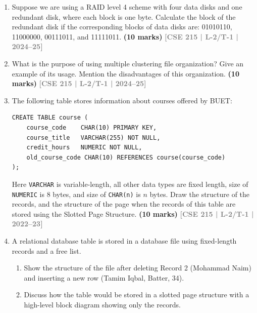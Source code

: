\documentclass[12pt]{article}
\newcommand{\yr}[1]{\hfill\textcolor{gray}{\small\textbf{[#1]}}}
\newcommand{\mk}[1]{\textcolor{orange!70!black}{\small\textbf{(#1 marks)}}}
\begin{document}
\begin{enumerate}


\item Suppose we are using a RAID level 4 scheme with four data disks and one redundant disk, where each block is one byte. Calculate the block of the redundant disk if the corresponding blocks of data disks are: 01010110, 11000000, 00111011, and 11111011.
\mk{10} \yr{CSE 215 | L-2/T-1 | 2024--25}


\item What is the purpose of using multiple clustering file organization? Give an example of its usage. Mention the disadvantages of this organization.
\mk{10} \yr{CSE 215 | L-2/T-1 | 2024--25}


\item The following table stores information about courses offered by BUET:
\begin{lstlisting}
CREATE TABLE course (
    course_code    CHAR(10) PRIMARY KEY,
    course_title   VARCHAR(255) NOT NULL,
    credit_hours   NUMERIC NOT NULL,
    old_course_code CHAR(10) REFERENCES course(course_code)
);
\end{lstlisting}
Here \texttt{VARCHAR} is variable-length, all other data types are fixed length, size of \texttt{NUMERIC} is 8 bytes, and size of \texttt{CHAR(n)} is $n$ bytes. Draw the structure of the records, and the structure of the page when the records of this table are stored using the Slotted Page Structure.
\mk{10} \yr{CSE 215 | L-2/T-1 | 2022--23}


\item A relational database table is stored in a database file using fixed-length records and a free list.
\begin{enumerate}
  \item Show the structure of the file after deleting Record 2 (Mohammad Naim) and inserting a new row (Tamim Iqbal, Batter, 34).
  \item Discuss how the table would be stored in a slotted page structure with a high-level block diagram showing only the records.
\end{enumerate}


\end{enumerate}
\end{document}

